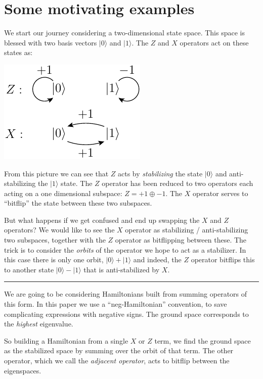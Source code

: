 \documentclass[11pt,oneside]{article}
\newcommand{\ket}[1]{|{#1}\rangle}
\newcommand\doexample[1]{\vskip 5pt \noindent {\bf \underline{Example #1.}\ }}
\newcommand\tombstone{\rule{.36em}{2ex}\vskip 5pt}
\newcounter{ritem}
\newcommand{\ritem}[1]{\refstepcounter{ritem}\theritem\label{#1}}
\begin{document}
\section{Some motivating examples}

\doexample{\ritem{Ex1}.}
We start our journey considering a two-dimensional state space.
This space is blessed with two basis vectors $\ket{0}$ and $\ket{1}.$
The $Z$ and $X$ operators act on these states as:
\begin{center}
\includegraphics[]{pic-zx.pdf}
\end{center}
From this picture we can see that $Z$ acts by \emph{stabilizing} the
state $\ket{0}$ and anti-stabilizing the $\ket{1}$ state.
The $Z$ operator has been reduced 
to two operators each acting on a one dimensional subspace:
$Z = +1 \oplus -1.$
The $X$ operator serves to ``bitflip'' the state between
these two subspaces.

But what happens if we get confused and end up swapping
the $X$ and $Z$ operators? We would like to see the $X$ operator
as stabilizing / anti-stabilizing two subspaces, together with the
$Z$ operator as bitflipping between these.
The trick is to consider the \emph{orbits} of the operator
we hope to act as a stabilizer.
In this case there is only one orbit, $\ket{0}+\ket{1}$
and indeed, the $Z$ operator bitflips this to another state
$\ket{0}-\ket{1}$ that is anti-stabilized by $X.$
\tombstone

We are going to be considering Hamiltonians built from
summing operators of this form.
In this paper we use a ``neg-Hamiltonian'' convention,
to save complicating expressions with negative signs.
The ground space corresponds to the \emph{highest} eigenvalue.

So building a Hamiltonian from a single $X$ or $Z$ term,
we find the ground space as the stabilized space
by summing over the orbit of that term.
The other operator,
which we call the \emph{adjacent operator}, acts to bitflip
between the eigenspaces.
\end{document}
